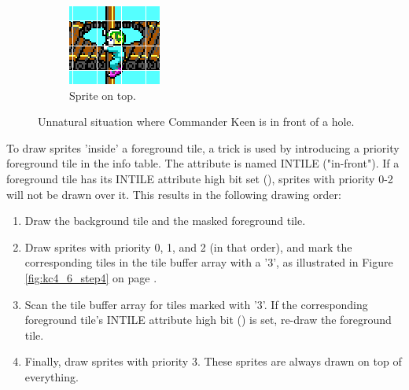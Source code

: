 \documentclass[book.tex]{subfiles}
\begin{document}
\begin{figure}[H]
\begin{subfigure}{.25\textwidth}
  \includegraphics[width=.9\textwidth]{screenshots_300dpi/game/tile_composite_3.png}
  \caption{Sprite on top.}
\end{subfigure}
\caption{Unnatural situation where Commander Keen is in front of a hole.}
\label{fig:draw_layers}
\end{figure}

\par
To draw sprites 'inside' a foreground tile, a trick is used by introducing a priority foreground tile in the  info table. The attribute is named INTILE ("in-front"). If a foreground tile has its INTILE attribute high bit set (), sprites with priority 0-2 will not be drawn over it. This results in the following drawing order:
\begin{enumerate}
  \item Draw the background tile and the masked foreground tile.
  \item Draw sprites with priority 0, 1, and 2 (in that order), and mark the corresponding tiles in the tile buffer array with a '3', as illustrated in Figure \ref{fig:kc4_6_step4} on page \pageref{fig:kc4_6_step4}. 
  \item Scan the tile buffer array for tiles marked with '3'. If the corresponding foreground tile's INTILE attribute high bit () is set, re-draw the foreground tile. 
  \item Finally, draw sprites with priority 3. These sprites are always drawn on top of everything.
\end{enumerate}
\par
\end{document}
